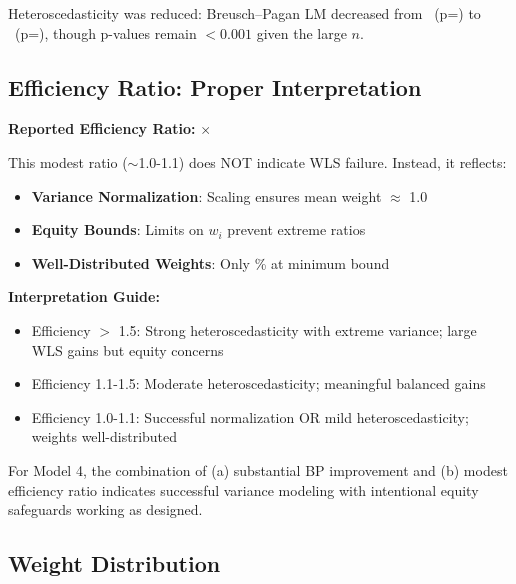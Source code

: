 \noindent
Heteroscedasticity was reduced: Breusch–Pagan LM decreased from \ModelFourBreuschPagan\ (p=\ModelFourBreuschPaganPValue) to \ModelFourBreuschPaganAfter\ (p=\ModelFourBreuschPaganPValueAfter), though p-values remain $<0.001$ given the large $n$.


\subsection{Efficiency Ratio: Proper Interpretation}

\textbf{Reported Efficiency Ratio:} \ModelFourEfficiencyRatio{}$\times$

This modest ratio ($\sim$1.0-1.1) does NOT indicate WLS failure. Instead, it reflects:

\begin{itemize}
    \item \textbf{Variance Normalization}: Scaling ensures mean weight $\approx$ 1.0
    \item \textbf{Equity Bounds}: Limits on $w_i$ prevent extreme ratios
    \item \textbf{Well-Distributed Weights}: Only \ModelFourWeightAtMinPct{}\% at minimum bound
\end{itemize}

\textbf{Interpretation Guide:}
\begin{itemize}
    \item Efficiency $>$ 1.5: Strong heteroscedasticity with extreme variance; large WLS gains but equity concerns
    \item Efficiency 1.1-1.5: Moderate heteroscedasticity; meaningful balanced gains
    \item Efficiency 1.0-1.1: Successful normalization OR mild heteroscedasticity; weights well-distributed
\end{itemize}

For Model 4, the combination of (a) substantial BP improvement and (b) modest efficiency ratio indicates successful variance modeling with intentional equity safeguards working as designed.

\subsection{Weight Distribution}

